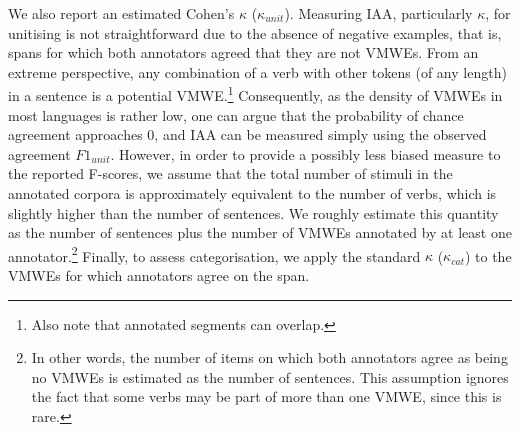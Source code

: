 \documentclass[output=paper,
modfonts,
]{langscibook}
\begin{document}
We also report an estimated Cohen's $\kappa$ ($\kappa_{unit}$).  %
Measuring IAA, particularly $\kappa$, for unitising is not straightforward due to the absence of negative examples, that is, spans for which both annotators agreed that they are not VMWEs. From an extreme perspective, any combination of a verb with other tokens (of any length) in a sentence is a potential VMWE.\footnote{Also note that annotated segments can  overlap.} Consequently, as the density of VMWEs in most languages is rather low, one can argue that the probability of chance agreement approaches 0, %
and IAA can be measured simply using the observed agreement $F1_{unit}$. However, in order to provide 
a possibly less biased measure to the reported F-scores, we assume that the total number of stimuli in the annotated corpora is 
approximately equivalent to the number of %
verbs, which %
is slightly higher than the number of sentences. We roughly estimate this quantity as the number of sentences plus the number of VMWEs annotated by at least one annotator.\footnote{In other words, the number of items on which both annotators agree as being no VMWEs is estimated as the number of sentences. 
This assumption ignores the fact that some verbs may be part of more than one VMWE, since this is rare.} 
%
Finally, to assess categorisation, we apply the standard $\kappa$ ($\kappa_{cat}$) to the VMWEs for which annotators agree on the span. 
\end{document}
